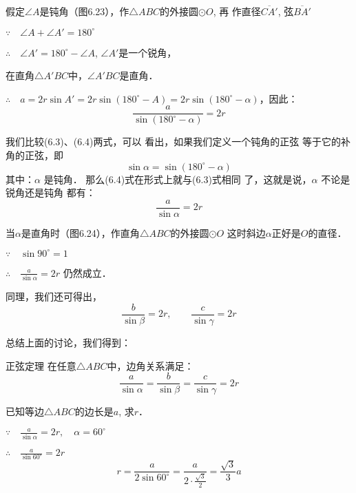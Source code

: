 假定$\angle A$是钝角（图6.23），作$\triangle ABC$的外接圆$\odot O$, 再
作直径$\overline{CA'}$, 弦$\overline{BA'}$

$\because\quad \angle A+\angle A'=180^{\circ}$

$\therefore\quad \angle A'=180^{\circ}-\angle A$, $\angle A'$是一个锐角，

在直角$\triangle A'BC$中，$\angle A'BC$是直角．

$\therefore\quad a=2r\sin A'=2r\sin(180^{\circ}-A)=2r\sin(180^{\circ}-\alpha)$，因此：
\begin{equation}
    \frac{a}{\sin(180^{\circ}-\alpha)}=2r
\end{equation}

我们比较(6.3)、(6.4)两式，可以
看出，如果我们定义一个钝角的正弦
等于它的补角的正弦，即
\[\sin\alpha  =\sin(180^{\circ}-\alpha )\]
其中：$\alpha$ 是钝角．
那么(6.4)式在形式上就与(6.3)式相同
了，这就是说，$\alpha$ 不论是锐角还是钝角
都有：
\[\frac{a}{\sin\alpha}=2r\]

\begin{figure}[htp]
    \centering
{}
    \caption{}
\end{figure}

当$\alpha$是直角时（图6.24），作直角$\triangle ABC$的外接圆$\odot O$
这时斜边$\alpha$正好是$O$的直径．

$\because\quad \sin90^{\circ}=1$

$\therefore\quad \frac{a}{\sin\alpha}=2r$
仍然成立．

同理，我们还可得出，
\[\frac{b}{\sin\beta}=2r,\qquad \frac{c}{\sin\gamma}=2r\]

总结上面的讨论，我们得到：

\begin{blk}
    {正弦定理}
在任意$\triangle ABC$中，边角关系满足：
\[\frac{a}{\sin\alpha}=\frac{b}{\sin\beta}=\frac{c}{\sin\gamma}=2r\]
\end{blk}

\begin{example}
    已知等边$\triangle ABC$的边长是$a$, 求$r$．
\end{example}

\begin{solution}
$\because\quad \frac{a}{\sin\alpha}=2r,\quad \alpha=60^{\circ}$

$\therefore\quad \frac{a}{\sin60^{\circ}}=2r$
\[r=\frac{a}{2\sin60^{\circ}}=\frac{a}{2\cdot \frac{\sqrt{3}}{2}}=\frac{\sqrt{3}}{3}a\]
\end{solution}

